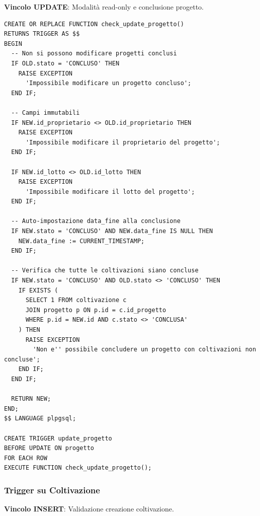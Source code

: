\documentclass[12pt,a4paper]{article}
\begin{document}
\textbf{Vincolo UPDATE}: Modalità read-only e conclusione progetto.

\begin{lstlisting}[style=sqlstyle]
CREATE OR REPLACE FUNCTION check_update_progetto()
RETURNS TRIGGER AS $$
BEGIN
  -- Non si possono modificare progetti conclusi
  IF OLD.stato = 'CONCLUSO' THEN 
    RAISE EXCEPTION 
      'Impossibile modificare un progetto concluso';
  END IF;

  -- Campi immutabili
  IF NEW.id_proprietario <> OLD.id_proprietario THEN 
    RAISE EXCEPTION 
      'Impossibile modificare il proprietario del progetto';
  END IF;

  IF NEW.id_lotto <> OLD.id_lotto THEN 
    RAISE EXCEPTION 
      'Impossibile modificare il lotto del progetto';
  END IF;

  -- Auto-impostazione data_fine alla conclusione
  IF NEW.stato = 'CONCLUSO' AND NEW.data_fine IS NULL THEN 
    NEW.data_fine := CURRENT_TIMESTAMP;
  END IF;

  -- Verifica che tutte le coltivazioni siano concluse
  IF NEW.stato = 'CONCLUSO' AND OLD.stato <> 'CONCLUSO' THEN 
    IF EXISTS (
      SELECT 1 FROM coltivazione c
      JOIN progetto p ON p.id = c.id_progetto
      WHERE p.id = NEW.id AND c.stato <> 'CONCLUSA'
    ) THEN
      RAISE EXCEPTION 
        'Non e'' possibile concludere un progetto con coltivazioni non concluse';
    END IF;
  END IF;

  RETURN NEW;
END;
$$ LANGUAGE plpgsql;  

CREATE TRIGGER update_progetto
BEFORE UPDATE ON progetto
FOR EACH ROW
EXECUTE FUNCTION check_update_progetto();
\end{lstlisting}

\subsubsection{Trigger su Coltivazione}

\textbf{Vincolo INSERT}: Validazione creazione coltivazione.
\end{document}
